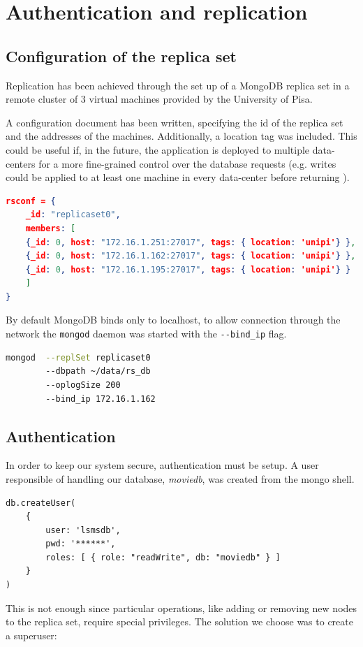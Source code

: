 \documentclass[11pt]{article}
\begin{document}
\section{Authentication and replication}
\subsection{Configuration of the replica set}
Replication has been achieved through the set up of a MongoDB replica set in a remote cluster of 3 virtual machines provided by the University of Pisa.

A configuration document has been written, specifying the id of the replica set and the addresses of the machines. Additionally, a location tag was included. This could be useful if, in the future, the application is deployed to multiple data-centers for a more fine-grained control over the database requests (e.g. writes could be applied to at least one machine in every data-center before returning ). 

\begin{lstlisting}[language=json]	
rsconf = {
	_id: "replicaset0",
	members: [
	{_id: 0, host: "172.16.1.251:27017", tags: { location: 'unipi'} },
	{_id: 0, host: "172.16.1.162:27017", tags: { location: 'unipi'} },
	{_id: 0, host: "172.16.1.195:27017", tags: { location: 'unipi'} }
	]
}
\end{lstlisting}

By default MongoDB binds only to localhost, to allow connection through the network the \lstinline{mongod} daemon was started with the \lstinline{--bind_ip} flag.

\begin{lstlisting}[language=bash]
mongod 	--replSet replicaset0
		--dbpath ~/data/rs_db
		--oplogSize 200 
		--bind_ip 172.16.1.162
\end{lstlisting}
\subsection{Authentication}
In order to keep our system secure, authentication must be setup.
A user responsible of handling our database, \textit{moviedb}, was created from the mongo shell.
\begin{lstlisting}
db.createUser(
	{
		user: 'lsmsdb',
		pwd: '******',
		roles: [ { role: "readWrite", db: "moviedb" } ]
	}
)
\end{lstlisting}

This is not enough since particular operations, like adding or removing new nodes to the replica set, require special privileges. The solution we choose was to create a superuser:
\end{document}
